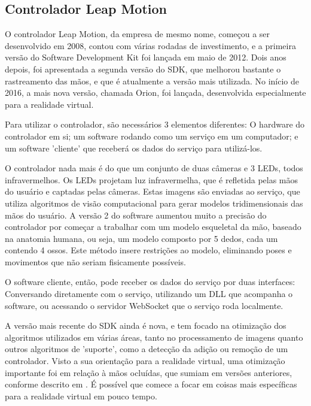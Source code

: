 \subsection{Controlador Leap Motion}\label{subsubsec-teo-leap-motion}

O controlador Leap Motion, da empresa de mesmo nome, começou a ser desenvolvido 
em 2008, contou com várias rodadas de investimento, e a primeira versão do 
Software Development Kit foi lançada em maio de 2012. Dois anos depois, foi 
apresentada a segunda versão do SDK, que melhorou bastante o rastreamento das 
mãos, e que é atualmente a versão mais utilizada. No início de 2016, a mais 
nova versão, chamada Orion, foi lançada, desenvolvida especialmente para a 
realidade virtual.

Para utilizar o controlador, são necessários 3 elementos diferentes: O hardware 
do controlador em si; um software rodando como um serviço em um computador; 
e um software 'cliente' que receberá os dados do serviço para utilizá-los.


O controlador nada mais é do que um conjunto de duas câmeras e 3 LEDs, todos 
infravermelhos. Os LEDs projetam luz infravermelha, que é refletida pelas mãos 
do usuário e captadas pelas câmeras. Estas imagens são enviadas ao serviço, 
que utiliza algoritmos de visão computacional para gerar modelos tridimensionais 
das mãos do usuário. A versão 2 do software aumentou muito a precisão do 
controlador por começar a trabalhar com um modelo esqueletal da mão, baseado 
na anatomia humana, ou seja, um modelo composto por 5 dedos, cada um contendo 
4 ossos. Este método insere restrições ao modelo, eliminando poses e movimentos 
que não seriam fisicamente possíveis.

O software cliente, então, pode receber os dados do serviço por duas interfaces:
Conversando diretamente com o serviço, utilizando um DLL que acompanha o software, 
ou acessando o servidor WebSocket que o serviço roda localmente.

A versão mais recente do SDK ainda é nova, e tem focado na otimização dos 
algoritmos utilizados em várias áreas, tanto no processamento de imagens quanto 
outros algoritmos de 'suporte', como a detecção da adição ou remoção de um 
controlador. Visto a sua orientação para a realidade virtual, uma otimização 
importante foi em relação à mãos ocluídas, que sumiam em versões anteriores, 
conforme descrito em \cite{leap:2016:changeset}. É possível que comece a focar 
em coisas mais específicas para a realidade virtual em pouco tempo.

